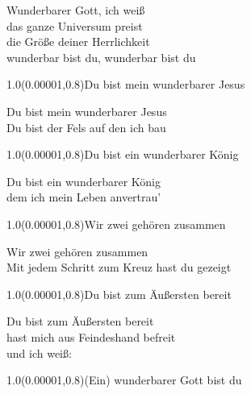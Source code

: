 \documentclass[aspectratio=169]{beamer}
\begin{document}
\begin{frame}
\centering
\color{white}
\huge{Wunderbarer Gott, ich weiß} \\
\huge{das ganze Universum preist} \\
\huge{die Größe deiner Herrlichkeit} \\
\huge{wunderbar bist du, wunderbar bist du} \\

\begin{textblock}{1.0}(0.00001,0.8)\color{gray}\normalsize{Du bist mein wunderbarer Jesus}\end{textblock}
\end{frame}

\begin{frame}
\centering
\color{white}
\huge{Du bist mein wunderbarer Jesus} \\
\huge{Du bist der Fels auf den ich bau} \\

\begin{textblock}{1.0}(0.00001,0.8)\color{gray}\normalsize{Du bist ein wunderbarer König}\end{textblock}
\end{frame}

\begin{frame}
\centering
\color{white}
\huge{Du bist ein wunderbarer König} \\
\huge{dem ich mein Leben anvertrau'} \\

\begin{textblock}{1.0}(0.00001,0.8)\color{gray}\normalsize{Wir zwei gehören zusammen}\end{textblock}
\end{frame}

\begin{frame}
\centering
\color{white}
\huge{Wir zwei gehören zusammen} \\
\huge{Mit jedem Schritt zum Kreuz hast du gezeigt} \\

\begin{textblock}{1.0}(0.00001,0.8)\color{gray}\normalsize{Du bist zum Äußersten bereit}\end{textblock}
\end{frame}

\begin{frame}
\centering
\color{white}
\huge{Du bist zum Äußersten bereit} \\
\huge{hast mich aus Feindeshand befreit} \\
\huge{und ich weiß:} \\

\begin{textblock}{1.0}(0.00001,0.8)\color{gray}\normalsize{(Ein) wunderbarer Gott bist du}\end{textblock}
\end{frame}
\end{document}
